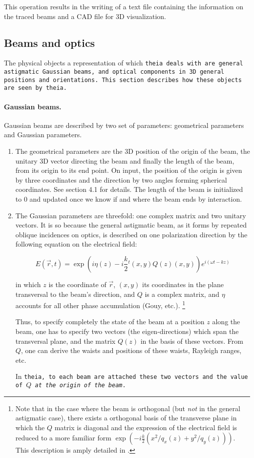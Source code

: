 \documentclass{article}
\begin{document}
This operation results in the writing of a text file containing the information on the traced beams and a CAD file for 3D visualization.

\subsection{Beams and optics}
The physical objects a representation of which \tt{theia} deals with are general astigmatic Gaussian beams, and optical components in 3D general positions and orientations. This section describes how these objects are seen by \tt{theia}.



\paragraph{Gaussian beams.}Gaussian beams are described by two set of parameters: geometrical parameters and Gaussian parameters.

\begin{enumerate}
\item The geometrical parameters are the 3D position of the origin of the beam, the unitary 3D vector directing the beam and finally the length of the beam, from its origin to its end point. On input, the position of the origin is given by three coordinates and the direction by two angles forming spherical coordinates. See section 4.1 for details. The length of the beam is initialized to 0 and updated once we know if and where the beam ends by interaction.

\item The Gaussian parameters are threefold: one complex matrix and two unitary vectors. It is so because the general astigmatic beam, as it forms by repeated oblique incidences on optics, is described on one polarization direction by the following equation on the electrical field:

$$ E(\vec r , t) = \exp(i\eta(z) -i\frac{k}{2} {}^t(x,y)Q(z)(x,y))e^{i(\omega t - kz)} $$

in which $z$ is the coordinate of $\vec r$, $(x,y)$ its coordinates in the plane transversal to the beam's direction, and $Q$ is a complex matrix, and $\eta$ accounts for all other phase accumulation (Gouy, etc.). \footnote{Note that in the case where the beam is orthogonal (but \textit{not} in the general astigmatic case), there exists a orthogonal basis of the transverse plane in which the $Q$ matrix is diagonal and the expression of the electrical field is reduced to a more familiar form $\exp(-i\frac{k}{2} (x^2/q_x(z) + y^2/q_y(z)))$. This description is amply detailed in \cite{1,2}.}

Thus, to specify completely the state of the beam at a position $z$ along the beam, one has to specify two vectors (the eigen-directions) which span the transversal plane, and the matrix $Q(z)$ in the basis of these vectors. From $Q$, one can derive the waists and positions of these waists, Rayleigh ranges, etc.

In \tt{theia}, to each beam are attached these two vectors and the value of $Q$ \textit{at the origin of the beam}.
\end{enumerate}
\end{document}
